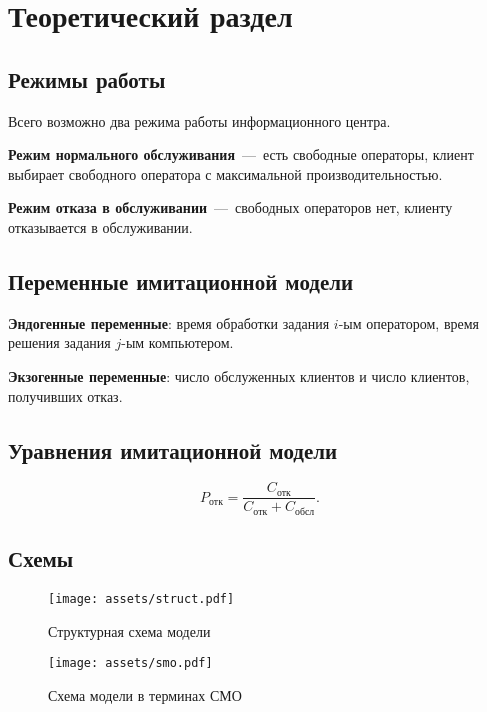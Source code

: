 \chapter{Теоретический раздел}

\section{Режимы работы}

Всего возможно два режима работы информационного центра. 

\textbf{Режим нормального обслуживания}~---~есть свободные операторы, клиент выбирает свободного оператора с максимальной производительностью.

\textbf{Режим отказа в обслуживании}~---~свободных операторов нет, клиенту отказывается в обслуживании.

\section{Переменные имитационной модели}

\textbf{Эндогенные переменные}: время обработки задания $i$-ым оператором, время решения задания $j$-ым компьютером.

\textbf{Экзогенные переменные}: число обслуженных клиентов и число клиентов, получивших отказ.

\section{Уравнения имитационной модели}

\begin{equation}
	P_{\text{отк}} = \frac{C_{\text{отк}}}{C_{\text{отк}} + C_{\text{обсл}}}.
\end{equation}

\section{Схемы}

\begin{figure}[ht]
    \centering
    \texttt{[image: assets/struct.pdf]}
    \caption{Структурная схема модели}
    \label{fig:struct}
\end{figure}

\newpage

\begin{figure}[ht]
    \centering
    \texttt{[image: assets/smo.pdf]}
    \caption{Схема модели в терминах СМО}
    \label{fig:smo}
\end{figure}

